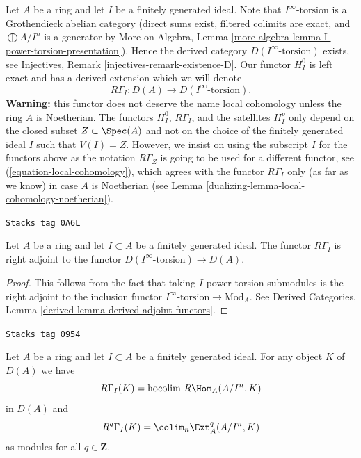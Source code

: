\medskip\noindent
Let $A$ be a ring and let $I$ be a finitely generated ideal.
Note that $I^\infty\text{-torsion}$ is a Grothendieck
abelian category (direct sums exist, filtered colimits are
exact, and $\bigoplus A/I^n$ is a generator by
More on Algebra, Lemma \ref{more-algebra-lemma-I-power-torsion-presentation}).
Hence the derived category $D(I^\infty\text{-torsion})$ exists, see
Injectives, Remark \ref{injectives-remark-existence-D}.
Our functor $H^0_I$ is left exact and has a derived extension
which we will denote
$$
R\Gamma_I : D(A) \longrightarrow D(I^\infty\text{-torsion}).
$$
{\bf Warning:} this functor does not deserve the name
local cohomology unless the ring $A$ is Noetherian.
The functors $H^0_I$, $R\Gamma_I$, and the satellites $H^p_I$
only depend on the closed subset $Z \subset \Spec(A)$ and not
on the choice of the finitely generated ideal $I$ such that
$V(I) = Z$. However, we insist on using the subscript $I$ for
the functors above as the notation $R\Gamma_Z$ is going
to be used for a different functor, see
(\ref{equation-local-cohomology}), which
agrees with the functor $R\Gamma_I$ only (as far as we know)
in case $A$ is Noetherian
(see Lemma \ref{dualizing-lemma-local-cohomology-noetherian}).

\begin{lemma}[Adjoint]
\label{dualizing-lemma-adjoint}
\href{https://stacks.math.columbia.edu/tag/0A6L}{\texttt{Stacks tag 0A6L}}

Let $A$ be a ring and let $I \subset A$ be a finitely generated ideal.
The functor $R\Gamma_I$ is right adjoint to the functor
$D(I^\infty\text{-torsion}) \to D(A)$.
\end{lemma}

\begin{proof}
This follows from the fact that taking $I$-power torsion submodules
is the right adjoint to the inclusion functor
$I^\infty\text{-torsion} \to \text{Mod}_A$. See
Derived Categories, Lemma \ref{derived-lemma-derived-adjoint-functors}.
\end{proof}

\begin{lemma}
\label{dualizing-lemma-local-cohomology-ext}
\href{https://stacks.math.columbia.edu/tag/0954}{\texttt{Stacks tag 0954}}

Let $A$ be a ring and let $I \subset A$ be a finitely generated ideal.
For any object $K$ of $D(A)$ we have
$$
R\Gamma_I(K) = \text{hocolim}\ R\Hom_A(A/I^n, K)
$$
in $D(A)$ and
$$
R^q\Gamma_I(K) = \colim_n \Ext_A^q(A/I^n, K)
$$
as modules for all $q \in \mathbf{Z}$.
\end{lemma}

